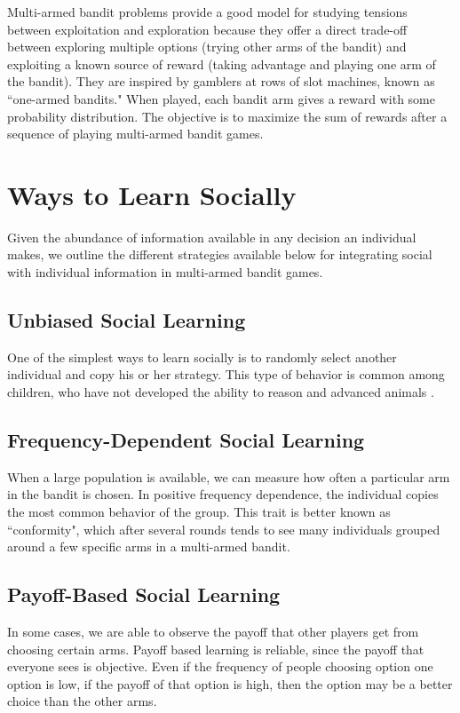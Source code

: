 \documentclass[11pt, a4paper]{article}
\begin{document}
Multi-armed bandit problems provide a good model for studying tensions between exploitation and exploration because they offer a direct trade-off between exploring multiple options (trying other arms of the bandit) and exploiting a known source of reward (taking advantage and playing one arm of the bandit). They are inspired by gamblers at rows of slot machines, known as ``one-armed bandits." When played, each bandit arm gives a reward with some probability distribution. The objective is to maximize the sum of rewards after a sequence of playing multi-armed bandit games. 

\section{Ways to Learn Socially}

Given the abundance of information available in any decision an individual makes, we outline the different strategies available below for integrating social  with individual information in multi-armed bandit games.

\subsection{Unbiased Social Learning}
One of the simplest ways to learn socially is to randomly select another individual and copy his or her strategy. This type of behavior is common among children, who have not developed the ability to reason and advanced animals \cite{Wood2013}.

\subsection{Frequency-Dependent Social Learning}
When a large population is available, we can measure how often a particular arm in the bandit is chosen. In positive frequency dependence, the individual copies the most common behavior of the group. This trait is better known as ``conformity", which after several rounds tends to see many individuals grouped around a few specific arms in a multi-armed bandit. 

\subsection{Payoff-Based Social Learning}
In some cases, we are able to observe the payoff that other players get from choosing certain arms. Payoff based learning is reliable, since the payoff that everyone sees is objective. Even if the frequency of people choosing option one option is low, if the payoff of that option is high, then the option may be a better choice than the other arms.
\end{document}
